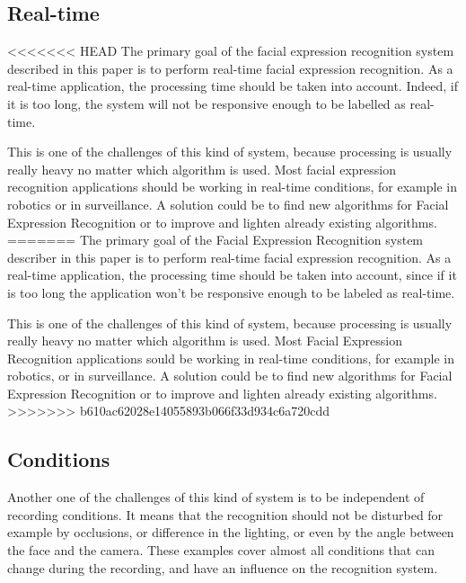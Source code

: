 \subsection{Real-time}

\vspace{\baselineskip}
<<<<<<< HEAD
\noindent The primary goal of the facial expression recognition system described in this paper is to perform real-time facial expression recognition. As a real-time application, the processing time should be taken into account. Indeed, if it is too long, the system will not be responsive enough to be labelled as real-time.
\newline

\noindent This is one of the challenges of this kind of system, because processing is usually really heavy no matter which algorithm is used. Most facial expression recognition applications should be working in real-time conditions, for example in robotics or in surveillance. A solution could be to find new algorithms for Facial Expression Recognition or to improve and lighten already existing algorithms.
=======
\noindent The primary goal of the Facial Expression Recognition system describer in this paper is to perform real-time facial expression recognition. As a real-time application, the processing time should be taken into account, since if it is too long the application won't be responsive enough to be labeled as real-time.
\newline

\noindent This is one of the challenges of this kind of system, because processing is usually really heavy no matter which algorithm is used. Most Facial Expression Recognition applications sould be working in real-time conditions, for example in robotics, or in surveillance. A solution could be to find new algorithms for Facial Expression Recognition or to improve and lighten already existing algorithms.
>>>>>>> b610ac62028e14055893b066f33d934c6a720cdd
\newline

\subsection{Conditions}

\vspace{\baselineskip}
\noindent Another one of the challenges of this kind of system is to be independent of recording conditions. It means that the recognition should not be disturbed for example by occlusions, or difference in the lighting, or even by the angle between the face and the camera. These examples cover almost all conditions that can change during the recording, and have an influence on the recognition system. 
\newline

